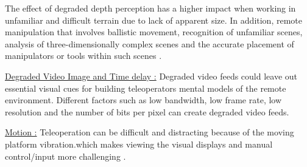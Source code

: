 The effect of degraded depth perception has a higher impact when working in unfamiliar and difficult terrain due to lack of apparent size. In addition, remote manipulation that involves ballistic movement, recognition of unfamiliar scenes, analysis of three-dimensionally complex scenes and the accurate placement of manipulators or tools within such scenes \cite{drascic1993investigation}.

\underline{Degraded Video Image and Time delay :}
Degraded video feeds could leave out essential visual cues for building teleoperators mental models of the remote environment. Different factors such as low bandwidth, low frame rate, low resolution and the number of bits per pixel can create degraded video feeds.

\underline{Motion :}
Teleoperation can be difficult and distracting because of the moving platform vibration.which makes viewing the visual displays and manual control/input more challenging \cite{schipani1998quantification}.

